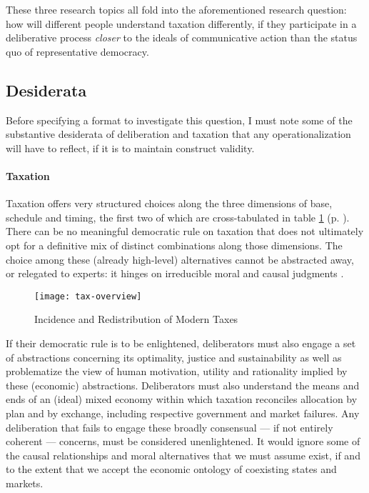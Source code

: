 These three research topics all fold into the aforementioned research question: how will different people understand taxation differently, if they participate in a deliberative process \emph{closer} to the ideals of communicative action than the status quo of representative democracy.

\subsection{Desiderata}
Before specifying a format to investigate this question, I must note some of the substantive desiderata of deliberation and taxation that any operationalization will have to reflect, if it is to maintain construct validity.

\paragraph{Taxation}
Taxation offers very structured choices along the three dimensions of base, schedule and timing, the first two of which are cross-tabulated in table \ref{tab:tax-overview} (p. \pageref{tab:tax-overview}).
There can be no meaningful democratic rule on taxation that does not ultimately opt for a definitive mix of distinct combinations along those dimensions. 
The choice among these (already high-level) alternatives cannot be abstracted away, or relegated to experts: it hinges on irreducible moral and causal judgments \citep[for example, ][]{McCaffery2005}.

\begin{landscape}
 \begin{figure}[htbp]
    \begin{center}
	\texttt{[image: tax-overview]}  
	\caption{Incidence and Redistribution of Modern Taxes}
	\label{tab:tax-overview}
	\end{center}
	
\end{figure}
\end{landscape}

If their democratic rule is to be enlightened, deliberators must also engage a set of abstractions concerning its optimality, justice and sustainability as well as problematize the view of human motivation, utility and rationality implied by these (economic) abstractions.
Deliberators must also understand the means and ends of an (ideal) mixed economy within which taxation reconciles allocation by plan and by exchange, including respective government and market failures.
Any deliberation that fails to engage these broadly consensual --- if not entirely coherent --- concerns, must be considered unenlightened. 
It would ignore some of the causal relationships and moral alternatives that we must assume exist, if and to the extent that we accept the economic ontology of coexisting states and markets.

